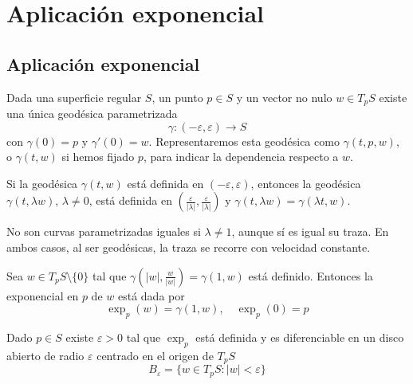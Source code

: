 \chapter{Aplicación exponencial}
\section{Aplicación exponencial}

\begin{definition}
    Dada una superficie regular $S$, un punto $p \in S$ y un vector no nulo $w \in T_pS$ existe una única geodésica parametrizada
    $$\gamma : (-\varepsilon, \varepsilon) \to S$$
    con $\gamma(0) = p$ y $\gamma'(0) = w$.
    Representaremos esta geodésica como $\gamma(t,p,w)$, o $\gamma(t,w)$ si hemos fijado $p$, para indicar la dependencia respecto a $w$.
\end{definition}

\begin{lemma}
    Si la geodésica $\gamma(t,w)$ está definida en $(-\varepsilon, \varepsilon)$, entonces la geodésica $\gamma(t, \lambda w)$, $\lambda \neq 0$, está definida en $(\frac{\varepsilon}{|\lambda|}, \frac{\varepsilon}{|\lambda|})$ y $\gamma(t, \lambda w) = \gamma(\lambda t, w)$.
\end{lemma}

\begin{remark}
    No son curvas parametrizadas iguales si $\lambda \neq 1$, aunque sí es igual su traza.
    En ambos casos, al ser geodésicas, la traza se recorre con velocidad constante.
\end{remark}

\begin{definition}
    Sea $w \in T_pS \setminus \{0\}$ tal que $\gamma(|w|, \frac{w}{|w|}) = \gamma(1, w)$ está definido.
    Entonces la exponencial en $p$ de $w$ está dada por
    $$\exp_p(w) = \gamma(1, w), \quad \exp_p(0) = p$$
\end{definition}

\begin{proposition}
    Dado $p \in S$ existe $\varepsilon>0$ tal que $\exp_p$ está definida y es diferenciable en un disco abierto de radio $\varepsilon$ centrado en el origen de $T_pS$
    $$B_\varepsilon = \{ w \in T_pS : |w| < \varepsilon \}$$
\end{proposition}

